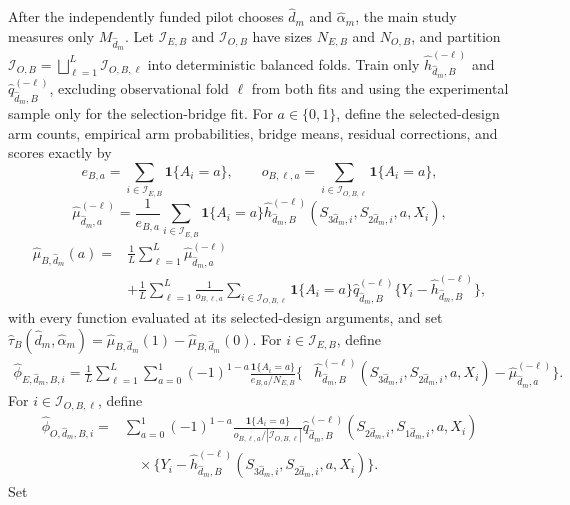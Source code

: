 After the independently funded pilot chooses \(\widehat d_m\) and \(\widehat\alpha_m\), the main study measures only \(M_{\widehat d_m}\). Let \(\mathcal I_{E,B}\) and \(\mathcal I_{O,B}\) have sizes \(N_{E,B}\) and \(N_{O,B}\), and partition \(\mathcal I_{O,B}=\bigsqcup_{\ell=1}^L\mathcal I_{O,B,\ell}\) into deterministic balanced folds. Train only \(\widehat h_{\widehat d_m,B}^{(-\ell)}\) and \(\widehat q_{\widehat d_m,B}^{(-\ell)}\), excluding observational fold \(\ell\) from both fits and using the experimental sample only for the selection-bridge fit. For \(a\in\{0,1\}\), define the selected-design arm counts, empirical arm probabilities, bridge means, residual corrections, and scores exactly by
\[
e_{B,a}=\sum_{i\in\mathcal I_{E,B}}\mathbf1\{A_i=a\},
\qquad
o_{B,\ell,a}=\sum_{i\in\mathcal I_{O,B,\ell}}\mathbf1\{A_i=a\},
\]
\[
\widehat\mu_{\widehat d_m,a}^{(-\ell)}
=\frac1{e_{B,a}}\sum_{i\in\mathcal I_{E,B}}\mathbf1\{A_i=a\}
\widehat h_{\widehat d_m,B}^{(-\ell)}(S_{3\widehat d_m,i},S_{2\widehat d_m,i},a,X_i),
\]
\[
\begin{aligned}
\widehat\mu_{B,\widehat d_m}(a)
={}&\frac1L\sum_{\ell=1}^L\widehat\mu_{\widehat d_m,a}^{(-\ell)}\\
&+\frac1L\sum_{\ell=1}^L\frac1{o_{B,\ell,a}}
\sum_{i\in\mathcal I_{O,B,\ell}}\mathbf1\{A_i=a\}\widehat q_{\widehat d_m,B}^{(-\ell)}
\{Y_i-\widehat h_{\widehat d_m,B}^{(-\ell)}\},
\end{aligned}
\]
with every function evaluated at its selected-design arguments, and set \(\widehat\tau_B(\widehat d_m,\widehat\alpha_m)=\widehat\mu_{B,\widehat d_m}(1)-\widehat\mu_{B,\widehat d_m}(0)\). For \(i\in\mathcal I_{E,B}\), define
\[
\begin{aligned}
\widehat\phi_{E,\widehat d_m,B,i}
=\frac1L\sum_{\ell=1}^L\sum_{a=0}^1(-1)^{1-a}
\frac{\mathbf1\{A_i=a\}}{e_{B,a}/N_{E,B}}
\bigl\{&\widehat h_{\widehat d_m,B}^{(-\ell)}
(S_{3\widehat d_m,i},S_{2\widehat d_m,i},a,X_i)
-\widehat\mu_{\widehat d_m,a}^{(-\ell)}\bigr\}.
\end{aligned}
\]
For \(i\in\mathcal I_{O,B,\ell}\), define
\[
\begin{aligned}
\widehat\phi_{O,\widehat d_m,B,i}
={}&\sum_{a=0}^1(-1)^{1-a}
\frac{\mathbf1\{A_i=a\}}{o_{B,\ell,a}/|\mathcal I_{O,B,\ell}|}
\widehat q_{\widehat d_m,B}^{(-\ell)}(S_{2\widehat d_m,i},S_{1\widehat d_m,i},a,X_i)\\
&\quad\times\bigl\{Y_i-\widehat h_{\widehat d_m,B}^{(-\ell)}
(S_{3\widehat d_m,i},S_{2\widehat d_m,i},a,X_i)\bigr\}.
\end{aligned}
\]
Set

